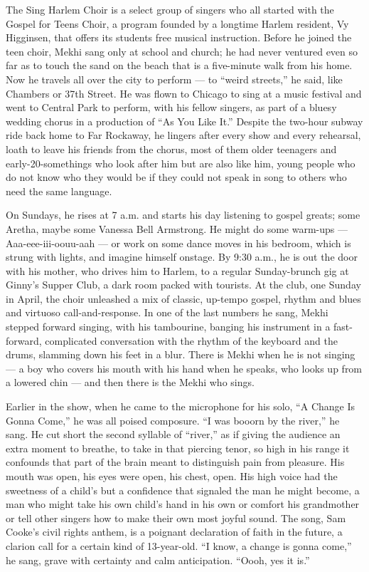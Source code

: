 The Sing Harlem Choir is a select group of singers who all started with
the Gospel for Teens Choir, a program founded by a longtime Harlem
resident, Vy Higginsen, that offers its students free musical
instruction. Before he joined the teen choir, Mekhi sang only at school
and church; he had never ventured even so far as to touch the sand on
the beach that is a five-minute walk from his home. Now he travels all
over the city to perform --- to ``weird streets,'' he said, like
Chambers or 37th Street. He was flown to Chicago to sing at a music
festival and went to Central Park to perform, with his fellow singers,
as part of a bluesy wedding chorus in a production of ``As You Like
It.'' Despite the two-hour subway ride back home to Far Rockaway, he
lingers after every show and every rehearsal, loath to leave his friends
from the chorus, most of them older teenagers and early-20-somethings
who look after him but are also like him, young people who do not know
who they would be if they could not speak in song to others who need the
same language.

On Sundays, he rises at 7 a.m. and starts his day listening to gospel
greats; some Aretha, maybe some Vanessa Bell Armstrong. He might do some
warm-ups --- Aaa-eee-iii-oouu-aah --- or work on some dance moves in his
bedroom, which is strung with lights, and imagine himself onstage. By
9:30 a.m., he is out the door with his mother, who drives him to Harlem,
to a regular Sunday-brunch gig at Ginny's Supper Club, a dark room
packed with tourists. At the club, one Sunday in April, the choir
unleashed a mix of classic, up-tempo gospel, rhythm and blues and
virtuoso call-and-response. In one of the last numbers he sang, Mekhi
stepped forward singing, with his tambourine, banging his instrument in
a fast-forward, complicated conversation with the rhythm of the keyboard
and the drums, slamming down his feet in a blur. There is Mekhi when he
is not singing --- a boy who covers his mouth with his hand when he
speaks, who looks up from a lowered chin --- and then there is the Mekhi
who sings.

Earlier in the show, when he came to the microphone for his solo, ``A
Change Is Gonna Come,'' he was all poised composure. ``I was booorn by
the river,'' he sang. He cut short the second syllable of ``river,'' as
if giving the audience an extra moment to breathe, to take in that
piercing tenor, so high in his range it confounds that part of the brain
meant to distinguish pain from pleasure. His mouth was open, his eyes
were open, his chest, open. His high voice had the sweetness of a
child's but a confidence that signaled the man he might become, a man
who might take his own child's hand in his own or comfort his
grandmother or tell other singers how to make their own most joyful
sound. The song, Sam Cooke's civil rights anthem, is a poignant
declaration of faith in the future, a clarion call for a certain kind of
13-year-old. ``I know, a change is gonna come,'' he sang, grave with
certainty and calm anticipation. ``Oooh, yes it is.''

